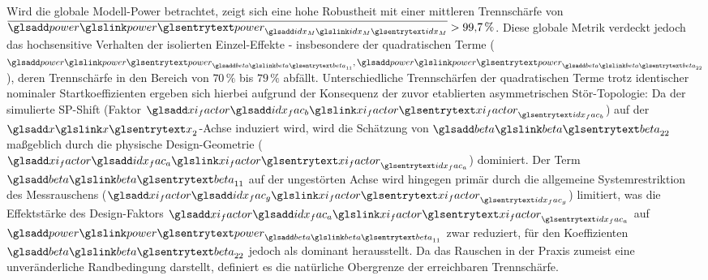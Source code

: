 Wird die globale Modell-Power betrachtet, zeigt sich eine hohe Robustheit mit einer mittleren Trennschärfe von $\overline{\sym{power}_{\sym{idx_M}}} > 99{,}7\,\%$.
Diese globale Metrik verdeckt jedoch das hochsensitive Verhalten der isolierten Einzel-Effekte - insbesondere der quadratischen Terme ($\sym{power}_{\sym{beta}_{11}}, \sym{power}_{\sym{beta}_{22}}$), deren Trennschärfe in den Bereich von $70\,\%$ bis $79\,\%$ abfällt.
Unterschiedliche Trennschärfen der quadratischen Terme trotz identischer nominaler Startkoeffizienten ergeben sich hierbei aufgrund der Konsequenz der zuvor etablierten asymmetrischen Stör-Topologie:
Da der simulierte \ac{SP}-Shift (Faktor $\symsub{xi_factor}{idx_fac_b}$) auf der $\sym{x}_2$-Achse induziert wird, wird die Schätzung von $\sym{beta}_{22}$ maßgeblich durch die physische Design-Geometrie ($\symsub{xi_factor}{idx_fac_a}$) dominiert.
Der Term $\sym{beta}_{11}$ auf der ungestörten Achse wird hingegen primär durch die allgemeine Systemrestriktion des Messrauschens ($\symsub{xi_factor}{idx_fac_g}$) limitiert, was die Effektstärke des Design-Faktors $\symsub{xi_factor}{idx_fac_a}$ auf $\sym{power}_{\sym{beta}_{11}}$ zwar reduziert, für den Koeffizienten $\sym{beta}_{22}$ jedoch als dominant herausstellt.
Da das Rauschen in der Praxis zumeist eine unveränderliche Randbedingung darstellt, definiert es die natürliche Obergrenze der erreichbaren Trennschärfe.
